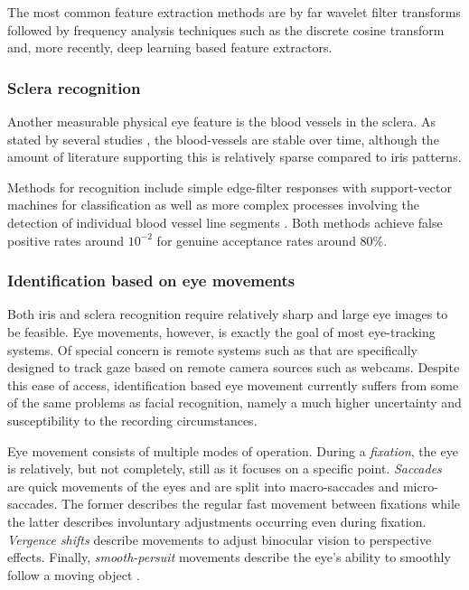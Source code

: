 The most common feature extraction methods are by far wavelet filter transforms \cite{daugmanHighConfidenceVisual1993, poursaberiIrisRecognitionPartially2007, limaEfficientIrisRecognition2004a, rydgrenIrisFeaturesExtraction2004, yongzhuBiometricPersonalIdentification2000} followed by frequency analysis techniques such as the discrete cosine transform\cite{monroDCTBasedIrisRecognition2007} and, more recently, deep learning based feature extractors\cite{gangwarDeepIrisNetDeepIris2016, nguyenIrisRecognitionOfftheShelf2018}.

\subsubsection{Sclera recognition}
Another measurable physical eye feature is the blood vessels in the sclera. As stated by several studies \cite{dasScleraRecognitionSurvey2013, zhouNewHumanIdentification2012}, the blood-vessels are stable over time, although the amount of literature supporting this is relatively sparse compared to iris patterns.

Methods for recognition include simple edge-filter responses with support-vector machines for classification \cite{dasNewEfficientAdaptive2014} as well as more complex processes involving the detection of individual blood vessel line segments \cite{zhouNewHumanIdentification2012}. Both methods achieve false positive rates around $10^{-2}$ for genuine acceptance rates around $80\%$.

\subsubsection{Identification based on eye movements}
Both iris and sclera recognition require relatively sharp and large eye images to be feasible. Eye movements, however, is exactly the goal of most eye-tracking systems. Of special concern is remote systems such as \cite{zhangMPIIGazeRealWorldDataset2017} that are specifically designed to track gaze based on remote camera sources such as webcams. Despite this ease of access, identification based eye movement currently suffers from some of the same problems as facial recognition, namely a much higher uncertainty and susceptibility to the recording circumstances.

Eye movement consists of multiple modes of operation. During a \emph{fixation}, the eye is relatively, but not completely, still as it focuses on a specific point. \emph{Saccades} are quick movements of the eyes and are split into macro-saccades and micro-saccades. The former describes the regular fast movement between fixations while the latter describes involuntary adjustments occurring even during fixation. \emph{Vergence shifts} describe movements to adjust binocular vision to perspective effects. Finally, \emph{smooth-persuit} movements describe the eye's ability to smoothly follow a moving object \cite{duchowskiBreadthfirstSurveyEyetracking2002}.

